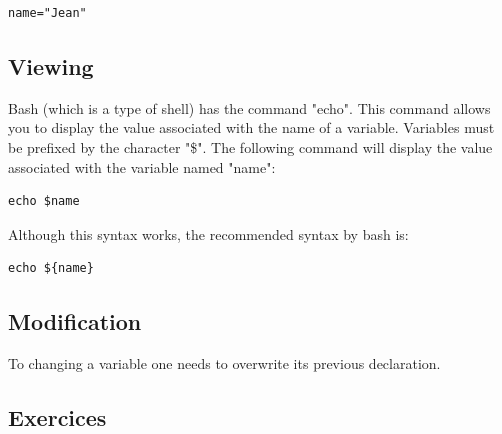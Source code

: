 \documentclass[11pt]{article}
\begin{document}
\begin{lstlisting}
name="Jean"
\end{lstlisting}

\subsection{Viewing}

Bash (which is a type of shell) has the command "echo". This command allows you to display the value associated with the name of a variable. Variables must be prefixed by the character "\$". The following command will display the value associated with the variable named "name":

\begin{lstlisting}
echo $name
\end{lstlisting}

Although this syntax works, the recommended syntax by bash is:

\begin{lstlisting}
echo ${name}
\end{lstlisting}

\subsection{Modification}

To changing a variable one needs to overwrite its previous declaration.

\subsection{Exercices}
\end{document}
